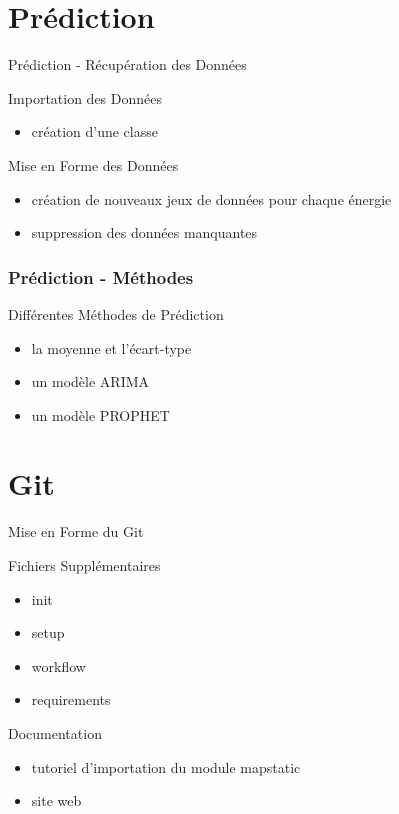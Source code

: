 \documentclass{beamer}
\begin{document}
\section{Prédiction}
\begin{frame}{Prédiction - Récupération des Données}
\begin{block}{Importation des Données}
\begin{itemize}
    \item création d'une classe
\end{itemize}
\end{block}
\begin{block}{Mise en Forme des Données}
\begin{itemize}
    \item création de nouveaux jeux de données pour chaque énergie
    \item suppression des données manquantes
\end{itemize}
\end{block}
\end{frame}

\begin{frame}
\frametitle{Prédiction - Méthodes}
\begin{block}{Différentes Méthodes de Prédiction}
  \begin{itemize}
    \item la moyenne et l'écart-type
    \item un modèle ARIMA
    \item un modèle PROPHET
\end{itemize} 
\end{block}
\end{frame}



\section{Git}
\begin{frame}{Mise en Forme du Git}
\begin{block}{Fichiers Supplémentaires}
    \begin{itemize}
    \item init
    \item setup
    \item workflow
    \item requirements
\end{itemize}
\end{block}
\begin{block}{Documentation}
\begin{itemize}
    \item tutoriel d'importation du module mapstatic
    \item site web
\end{itemize}
\end{block}
\end{frame}
\end{document}
